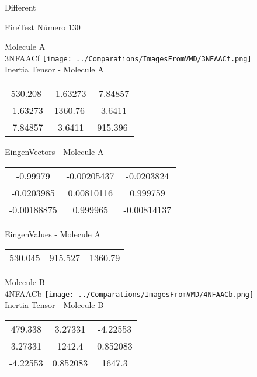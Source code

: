 \begin{center}
\vtab
\vtab
\textcolor{NavyBlue}{\Large Different}
\end{center}

 \newpage

\vtab[-2cm]
\begin{center}
{\large FireTest \tab Número 130}
\end{center}
\begin{multicols}{2}
\begin{center}

Molecule A \\ 
3NFAACf
\texttt{[image: ../Comparations/ImagesFromVMD/3NFAACf.png]}
\\
Inertia Tensor - Molecule A \\
\vtab

\begin{tabular}{|c c c|}
530.208	 & 	-1.63273	 & 	-7.84857	 \\
-1.63273	 & 	1360.76	 & 	-3.6411	 \\
-7.84857	 & 	-3.6411	 & 	915.396
\end{tabular}

\vtab
 EingenVectors - Molecule A     \\
\vtab
\begin{tabular}{|c c c|}
-0.99979	 & 	-0.00205437	 & 	-0.0203824	 \\
-0.0203985	 & 	0.00810116	 & 	0.999759	 \\
-0.00188875	 & 	0.999965	 & 	-0.00814137
\end{tabular}

\vtab
 EingenValues - Molecule A     \\
\vtab
\begin{tabular}{|c c c|}
530.045	 & 	915.527	 & 	1360.79	 \\
\end{tabular}
\columnbreak

Molecule B \\ 
4NFAACb
\texttt{[image: ../Comparations/ImagesFromVMD/4NFAACb.png]}
\\
Inertia Tensor - Molecule B \\
\vtab

\begin{tabular}{|c c c|}
479.338	 & 	3.27331	 & 	-4.22553	 \\
3.27331	 & 	1242.4	 & 	0.852083	 \\
-4.22553	 & 	0.852083	 & 	1647.3
\end{tabular}


\end{center}
\end{multicols}
